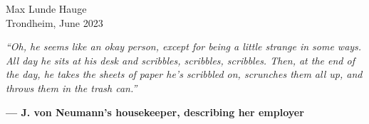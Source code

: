 \vspace*{1cm}

\begin{flushright}
    Max Lunde Hauge\\
    Trondheim, June 2023
\end{flushright}

\clearpage

\thispagestyle{empty} %

\vspace*{\fill}
\begin{center}
    \textit{\enquote{Oh, he seems like an okay person, except for being a little strange in some ways. All day he sits at his desk and scribbles, scribbles, scribbles. Then, at the end of the day, he takes the sheets of paper he's scribbled on, scrunches them all up, and throws them in the trash can.}}\\
\end{center}
\begin{flushright}
    \textbf{— J. von Neumann's housekeeper, describing her employer}
\end{flushright}
\vspace*{\fill}

\restoregeometry %





